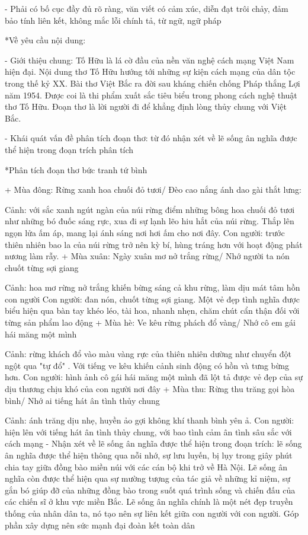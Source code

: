 \documentclass{article}
\begin{document}
{\begin{mdframed}[linewidth=1pt,linecolor=red]
		- Phải có bố cục đầy đủ rõ ràng, văn viết có cảm xúc, diễn đạt trôi chảy, đảm bảo tính liên kết, không mắc lỗi chính tả, từ ngữ, ngữ pháp
		
		*Về yêu cầu nội dung:
		
		- Giới thiệu chung: Tố Hữu là lá cờ đầu của nền văn nghệ cách mạng Việt Nam hiện đại. Nội dung thơ Tố Hữu hướng tới những sự kiện cách mạng của dân tộc trong thế kỷ XX. Bài thơ Việt Bắc ra đời sau kháng chiến chống Pháp thắng Lợi năm 1954. Được coi là thi phẩm xuất sắc tiêu biểu trong phong cách nghệ thuật thơ Tố Hữu. Đoạn thơ là lời người đi để khẳng định lòng thủy chung với Việt Bắc.
		
		- Khái quát vấn đề phân tích đoạn thơ: từ đó nhận xét về lẽ sống ân nghĩa được thể hiện trong đoạn trích phân tích
		
		*Phân tích đoạn thơ bức tranh tứ bình
		
		+ Mùa đông: Rừng xanh hoa chuối đỏ tươi/ Đèo cao nắng ánh dao gài thắt lưng:
		
		Cảnh: với sắc xanh ngút ngàn của núi rừng điểm những bông hoa chuối đỏ tươi như những bó đuốc sáng rực, xua đi sự lạnh lẽo hiu hắt của núi rừng. Thắp lên ngọn lửa ấm áp, mang lại ánh sáng nơi hơi ấm cho nơi đây.
		Con người: trước thiên nhiên bao la của núi rừng trở nên kỳ bí, hùng tráng hơn với hoạt động phát nương làm rẫy.
		+ Mùa xuân: Ngày xuân mơ nở trắng rừng/ Nhớ người ta nón chuốt từng sợi giang
		
		Cảnh: hoa mơ rừng nở trắng khiến bừng sáng cả khu rừng, làm dịu mát tâm hồn con người
		Con người: đan nón, chuốt từng sợi giang. Một vẻ đẹp tình nghĩa được biểu hiện qua bàn tay khéo léo, tài hoa, nhanh nhẹn, chăm chút cẩn thận đối với từng sản phẩm lao động
		+ Mùa hè: Ve kêu rừng phách đổ vàng/ Nhớ cô em gái hái măng một mình
		
		Cảnh: rừng khách đổ vào màu vàng rực của thiên nhiên dường như chuyển đột ngột qua "tự đổ" . Với tiếng ve kêu khiến cảnh sinh động có hồn và tưng bừng hơn.
		Con người: hình ảnh cô gái hái măng một mình đã lột tả được vẻ đẹp của sự dịu thương chịu khó của con người nơi đây
		+ Mùa thu: Rừng thu trăng gọi hòa bình/ Nhớ ai tiếng hát ân tình thủy chung
		
		Cảnh: ánh trăng dịu nhẹ, huyền ảo gợi không khí thanh bình yên ả.
		Con người: hiện lên với tiếng hát ân tình thủy chung, với bao tình cảm ân tình sâu sắc với cách mạng
		- Nhận xét về lẽ sống ân nghĩa được thể hiện trong đoạn trích: lẽ sống ân nghĩa được thể hiện thông qua nỗi nhớ, sự lưu luyến, bị lụy trong giây phút chia tay giữa đồng bào miền núi với các cán bộ khi trở về Hà Nội. Lẽ sống ân nghĩa còn được thể hiện qua sự mường tượng của tác giả về những kỉ niệm, sự gắn bó giúp đỡ của những đồng bào trong suốt quá trình sống và chiến đấu của các chiến sĩ ở khu vực miền Bắc. Lẽ sống ân nghĩa chính là một nét đẹp truyền thống của nhân dân ta, nó tạo nên sự liên kết giữa con người với con người. Góp phần xây dựng nên sức mạnh đại đoàn kết toàn dân
		

\end{mdframed}}
\end{document}
